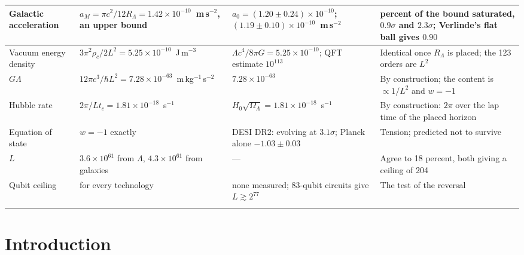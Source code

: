 \documentclass[aps,prd,twocolumn,superscriptaddress,nofootinbib,showkeys]{revtex4-2}
\newcommand{\tc}{t_c}
\newcommand{\RL}{R_\Lambda}
\begin{document}
\begin{ruledtabular}
\begin{tabular}{>{\raggedright\arraybackslash}p{2.3cm}>{\raggedright\arraybackslash}p{5.2cm}>{\raggedright\arraybackslash}p{4.3cm}>{\raggedright\arraybackslash}p{5.2cm}}
\hline
Galactic acceleration & $a_M = \pi c^2/12\RL = 1.42\times10^{-10}$~m\,s$^{-2}$, an upper bound & $a_0 = (1.20\pm0.24)\times10^{-10}$; $(1.19\pm0.10)\times10^{-10}$~m\,s$^{-2}$ & 85 percent of the bound saturated, $0.9\sigma$ and $2.3\sigma$; Verlinde's flat ball gives $0.90$ \\
\hline
Vacuum energy density & $3\pi^2\rho_c/2L^2 = 5.25\times10^{-10}$~J\,m$^{-3}$ & $\Lambda c^4/8\pi G = 5.25\times10^{-10}$; QFT estimate $10^{113}$ & Identical once $\RL$ is placed; the 123 orders are $L^2$ \\
\hline
$G\Lambda$ & $12\pi c^3/\hbar L^2 = 7.28\times10^{-63}$~m\,kg$^{-1}$\,s$^{-2}$ & $7.28\times10^{-63}$ & By construction; the content is $\propto1/L^2$ and $w = -1$ \\
\hline
Hubble rate & $2\pi/L\tc = 1.81\times10^{-18}$~s$^{-1}$ & $H_0\sqrt{\Omega_\Lambda} = 1.81\times10^{-18}$~s$^{-1}$ & By construction: $2\pi$ over the lap time of the placed horizon \\
\hline
Equation of state & $w = -1$ exactly & DESI DR2: evolving at $3.1\sigma$; Planck alone $-1.03\pm0.03$ & Tension; predicted not to survive \\
\hline
$L$ & $3.6\times10^{61}$ from $\Lambda$, $4.3\times10^{61}$ from galaxies & --- & Agree to 18 percent, both giving a ceiling of 204 \\
\hline
Qubit ceiling & 204 for every technology & none measured; 83-qubit circuits give $L\gtrsim2^{77}$ & The test of the reversal \\
\arrayrulecolor{black}
\end{tabular}
\end{ruledtabular}
\endgroup
\vspace{8pt}
\twocolumngrid

\section{Introduction}
\end{document}
